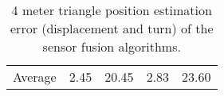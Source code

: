 \begin{table}[H]
\begin{center}
{\begin{tabular}[t]{lcccc}
                \hline
                Average          & 2.45                    & 20.45                  & 2.83            & 23.60
            \end{tabular}
        }
        \caption{4 meter triangle position estimation error (displacement and turn) of the sensor fusion algorithms. }
        \label{tab:4_triangle}
    \end{center}
\end{table}